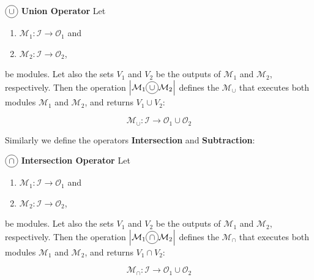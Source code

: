 \begin{definition}\label{op:union}
$\circled{$\cup$}$ {\bf Union Operator} Let 
\begin{enumerate}%
	\item $\mathcal{M}_1 : \mathcal{I} \rightarrow \mathcal{O}_1$ and  
	\item $\mathcal{M}_2 : \mathcal{I} \rightarrow \mathcal{O}_2$,
\end{enumerate}%
be modules. %
Let also the sets $V_1$ and $V_2$ be the outputs of $\mathcal{M}_1$ and $\mathcal{M}_2$, respectively. Then the operation $\left|\mathcal{M}_1\circled{$\cup$}\mathcal{M}_2\right|$ defines the \cm{} $\mathcal{M}_{\cup}$ that executes both modules $\mathcal{M}_1$ and $\mathcal{M}_2$, and returns $V_1\cup V_2$:

\[
\mathcal{M}_{\cup}:\mathcal{I} \rightarrow \mathcal{O}_1 \cup \mathcal{O}_2
\]
\end{definition}

\separation

Similarly we define the operators \textbf{Intersection} and \textbf{Subtraction}:

\begin{definition}\label{op:intersec}
$\circled{$\cap$}$ {\bf Intersection Operator} Let 
\begin{enumerate}%
	\item $\mathcal{M}_1 : \mathcal{I} \rightarrow \mathcal{O}_1$ and  
	\item $\mathcal{M}_2 : \mathcal{I} \rightarrow \mathcal{O}_2$,
\end{enumerate}%
be modules. %
Let also the sets $V_1$ and $V_2$ be the outputs of $\mathcal{M}_1$ and $\mathcal{M}_2$, respectively. Then the operation $\left|\mathcal{M}_1\circled{$\cap$}\mathcal{M}_2\right|$ defines the \cm{} $\mathcal{M}_{\cap}$ that executes both modules $\mathcal{M}_1$ and $\mathcal{M}_2$, and returns $V_1\cap V_2$:

\[
\mathcal{M}_{\cap}:\mathcal{I} \rightarrow \mathcal{O}_1 \cup \mathcal{O}_2
\]
\end{definition}

\separation


